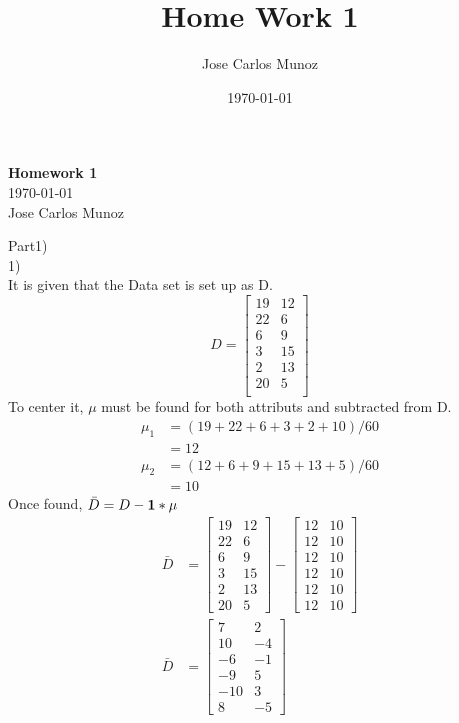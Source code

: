 \documentclass[12pt,english]{article}
\title{Home Work 1}
\date{\today}
\author{Jose Carlos Munoz}
\begin{document}
\begin{center}
    \Large
    \textbf{Homework 1}\\
    \small
    \today\\
    \large
    Jose Carlos Munoz
\end{center}
Part1)\\
1)\\
It is given that the Data set is set up as D.\\
\begin{equation*}
D =
\begin{bmatrix}19 & 12 \\22 &  6 \\6  &  9 \\3 &  15 \\2 &  13 \\20 &  5 \\\end{bmatrix}
\end{equation*}
To center it, $\mu$ must be found for both attributs and subtracted from D.
\begin{equation*}
\begin{split}
\mu_{1} &= (19+22+6+3+2+10) / 60\\
 &= 12 \\
\mu_{2} &= (12+6+9+15+13+5) / 60\\
 &= 10
\end{split}
\end{equation*}
Once found, $\bar{D}= D -\bold{1}*\mu$
\begin{equation*}
\begin{split}
\bar{D}&=
\begin{bmatrix}19 & 12 \\22 &  6 \\ 6  &  9 \\ 3 &  15 \\ 2 &  13 \\20 &  5 \end{bmatrix}
-
\begin{bmatrix}12 & 10 \\12 & 10 \\12 & 10 \\12 & 10 \\12 & 10 \\12 & 10 \end{bmatrix}\\
\bar{D}&=
\begin{bmatrix}7 &  2 \\10 & -4 \\-6 & -1 \\-9 &  5 \\-10 &  3 \\8 & -5 \end{bmatrix}
\end{split}
\end{equation*}
\end{document}

